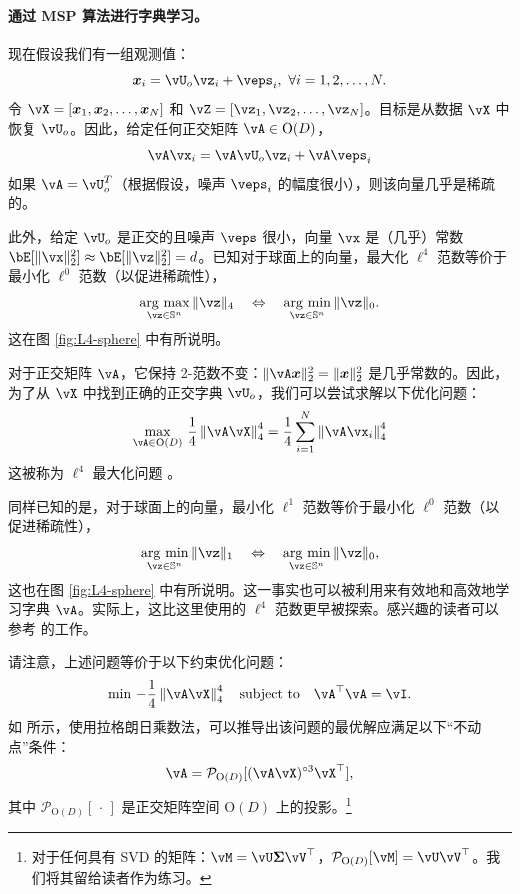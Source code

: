 \documentclass[../../book-main_zh.tex]{subfiles}
\begin{document}
\paragraph{通过 MSP 算法进行字典学习。}

现在假设我们有一组观测值：
\begin{equation}
    \x_i = \vU_o \vz_i + \veps_i,\ \forall i =1, 2, \ldots, N.
\end{equation}
令 $\vX = [\x_1, \x_2, \ldots, \x_N]$ 和 $\vZ = [\vz_1, \vz_2, \ldots, \vz_N]$。目标是从数据 $\vX$ 中恢复 $\vU_o$。因此，给定任何正交矩阵 $\vA \in \mathrm{O}(D)$，$$\vA\vx_i = \vA\vU_o \vz_i + \vA\veps_i$$ 如果 $\vA = \vU_o^T$（根据假设，噪声 $\veps_i$ 的幅度很小），则该向量几乎是稀疏的。

此外，给定 $\vU_o$ 是正交的且噪声 $\veps$ 很小，向量 $\vx$ 是（几乎）常数 $\bE[\norm{\vx}_2^2] \approx \bE[\norm{\vz}_2^2]=d$。已知对于球面上的向量，最大化 $\ell^4$ 范数等价于最小化 $\ell^0$ 范数（以促进稀疏性），
\begin{equation*}
            \argmax_{\vz \in \mathbb{S}^n}\|\vz\|_{4}\quad\Leftrightarrow\quad \argmin_{\vz \in \mathbb{S}^n}\|\vz\|_{0}.
\end{equation*}
这在图 \ref{fig:L4-sphere} 中有所说明。

对于正交矩阵 $\vA$，它保持 2-范数不变：$\|\vA \x\|_2^2 = \|\x\|_2^2$ 是几乎常数的。因此，为了从 $\vX$ 中找到正确的正交字典 $\vU_o$，我们可以尝试求解以下优化问题：
\begin{equation}\label{eq:orthogonal-dictionary-learning-l4}
    \max_{\vA \in \mathrm{O}(D)}\,
     \frac{1}{4} \norm*{
    \vA \vX
    }_4^4 =  \frac{1}{4} \sum_{i=1}^N \norm*{
    \vA \vx_i
    }_4^4
\end{equation}
这被称为 $\ell^4$ 最大化问题 \cite{Zhai-2020}。
\begin{remark}
    同样已知的是，对于球面上的向量，最小化 $\ell^1$ 范数等价于最小化 $\ell^0$ 范数（以促进稀疏性），
\begin{equation*}
            \argmin_{\vz \in \mathbb{S}^n}\|\vz\|_{1}\quad\Leftrightarrow\quad \argmin_{\vz \in \mathbb{S}^n}\|\vz\|_{0},
\end{equation*}
这也在图 \ref{fig:L4-sphere} 中有所说明。这一事实也可以被利用来有效地和高效地学习字典 $\vA$。实际上，这比这里使用的 $\ell^4$ 范数更早被探索。感兴趣的读者可以参考 \cite{qu2020findingsparsestvectorssubspace} 的工作。
\end{remark}

请注意，上述问题等价于以下约束优化问题：
\begin{equation}\label{eq:orthogonal-dictionary-learning-l4}
    \min\,
    -   \frac{1}{4} \norm*{
    \vA \vX
    }_4^4 \quad \mbox{subject to} \quad  \vA^\top\vA = \vI.
\end{equation}
如 \cite{Wright-Ma-2022} 所示，使用拉格朗日乘数法，可以推导出该问题的最优解应满足以下“不动点”条件：
$$
\vA = \mathcal{P}_{\mathrm O(D)}[( {\vA \vX})^{\circ3}\vX^\top],
$$
其中 $\mathcal{P}_{\mathrm O(D)}[\,\cdot\,]$ 是正交矩阵空间 $\mathrm O(D)$ 上的投影。\footnote{对于任何具有 SVD 的矩阵：$\vM = \vU\bm \Sigma \vV^\top$，$\mathcal{P}_{\mathrm O(D)}[\vM] = \vU \vV^\top$。我们将其留给读者作为练习。}
\end{document}
